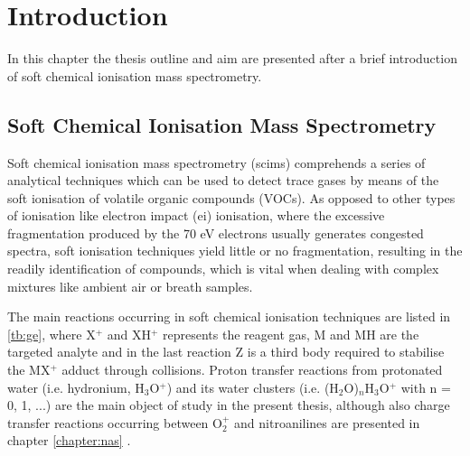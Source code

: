 \chapter{Introduction}
In this chapter the thesis outline and aim are presented after a brief introduction of soft chemical ionisation mass spectrometry.







\section{Soft Chemical Ionisation Mass Spectrometry}
Soft chemical ionisation mass spectrometry (\acrshort{scims}) comprehends a series of analytical techniques which can be used to detect trace gases by means of the soft ionisation of volatile organic compounds (\acrshort{VOC}s). As opposed to other types of ionisation like electron impact (\acrshort{ei}) ionisation, where the excessive fragmentation produced by the 70 eV electrons usually generates congested spectra, soft ionisation techniques yield little or no fragmentation, resulting in the readily identification of compounds, which is vital when dealing with complex mixtures like ambient air or breath samples.









The main reactions occurring in soft chemical ionisation techniques are listed in \autoref{tb:ge}, where X$^+$ and XH$^+$ represents the reagent gas, M and MH are the targeted analyte and in the last reaction Z is a third body required to stabilise the MX$^+$ adduct through collisions.
%
Proton transfer reactions from protonated water (i.e. hydronium, H$_3$O$^+$) and its water clusters (i.e. (H$_2$O)$_n$H$_3$O$^+$ with n = 0, 1, ...) are the main object of study in the present thesis, although also charge transfer reactions occurring between O$_2^+$ and nitroanilines are  presented in chapter \ref{chapter:nas} \cite{ellis2013proton}.


